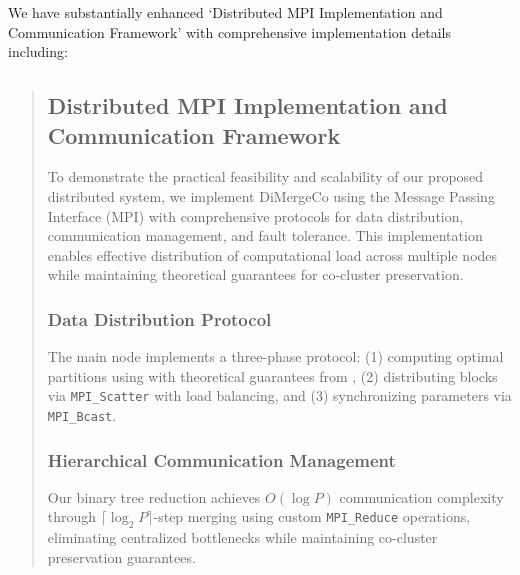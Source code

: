 \documentclass{ar2rc}
\theoremstyle{definition}
\theoremstyle{remark} %
\begin{document}
We have substantially enhanced  `Distributed MPI Implementation and Communication Framework' with comprehensive implementation details including:

\begin{quote}
  \subsection*{ Distributed MPI Implementation and Communication Framework}
  To demonstrate the practical feasibility and scalability of our proposed distributed system, we implement DiMergeCo using the Message Passing Interface (MPI) with comprehensive protocols for data distribution, communication management, and fault tolerance. This implementation enables effective distribution of computational load across multiple nodes while maintaining theoretical guarantees for co-cluster preservation.
  \subsubsection*{ Data Distribution Protocol}
  The main node implements a three-phase protocol: (1) computing optimal partitions using  with theoretical guarantees from , (2) distributing blocks via \texttt{MPI\_Scatter} with load balancing, and (3) synchronizing parameters via \texttt{MPI\_Bcast}.

  \subsubsection*{ Hierarchical Communication Management}
  Our binary tree reduction achieves $O(\log P)$ communication complexity through $\lceil \log_2 P \rceil$-step merging using custom \texttt{MPI\_Reduce} operations, eliminating centralized bottlenecks while maintaining co-cluster preservation guarantees.
\end{quote}


\end{document}

